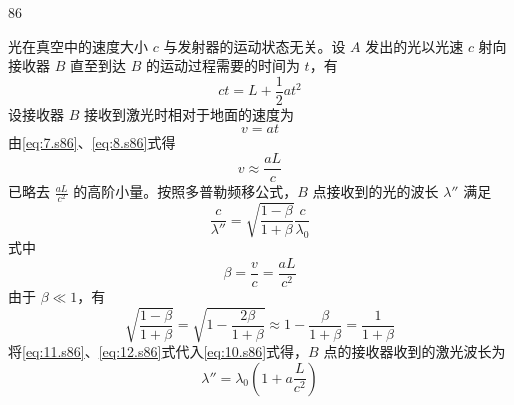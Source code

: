 \begin{solution}{86}
\begin{subsolution}
\begin{subsubsolution}
\begin{subsubsubsolution}
\begin{subsubsubsubsolution}
                    光在真空中的速度大小 $c$ 与发射器的运动状态无关。设 $A$ 发出的光以光速 $c$ 射向接收器 $B$ 直至到达 $B$ 的运动过程需要的时间为 $t$，有
                    \begin{equation}
                        c t = L + \frac{1}{2} a t^{2}
                        \label{eq:7.s86}
                    \end{equation}
                    设接收器 $B$ 接收到激光时相对于地面的速度为
                    \begin{equation}
                        v = a t
                        \label{eq:8.s86}
                    \end{equation}
                    由\eqref{eq:7.s86}、\eqref{eq:8.s86}式得
                    \begin{equation}
                        v \approx \frac{a L}{c}
                        \label{eq:9.s86}
                    \end{equation}
                    已略去 $\frac{aL}{c^{2}}$ 的高阶小量。按照多普勒频移公式，$B$ 点接收到的光的波长 $\lambda''$ 满足
                    \begin{equation}
                        \frac{c}{\lambda''} = \sqrt{\frac{1-\beta}{1+\beta}} \frac{c}{\lambda_{0}}
                        \label{eq:10.s86}
                    \end{equation}
                    式中
                    \begin{equation}
                        \beta = \frac{v}{c} = \frac{a L}{c^{2}}
                        \label{eq:11.s86}
                    \end{equation}
                    由于 $\beta \ll 1$，有
                    \begin{equation}
                        \sqrt{\frac{1-\beta}{1+\beta}} = \sqrt{1 - \frac{2\beta}{1+\beta}} \approx 1 - \frac{\beta}{1+\beta} = \frac{1}{1+\beta}
                        \label{eq:12.s86}
                    \end{equation}
                    将\eqref{eq:11.s86}、\eqref{eq:12.s86}式代入\eqref{eq:10.s86}式得，$B$ 点的接收器收到的激光波长为
                    \begin{equation}
                        \lambda'' = \lambda_{0} \left(1 + a \frac{L}{c^{2}}\right)
                        \label{eq:13.s86}
                    \end{equation}
                \end{subsubsubsubsolution}
                \begin{subsubsubsubsolution}

\end{subsubsubsubsolution}
\end{subsubsubsolution}
\end{subsubsolution}
\end{subsolution}
\end{solution}
